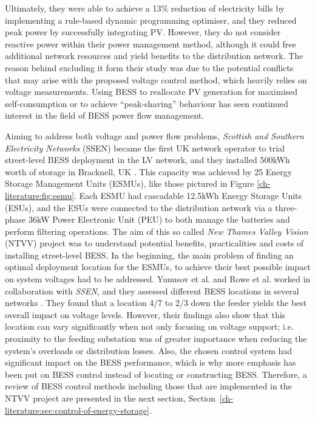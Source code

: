 Ultimately, they were able to achieve a 13\% reduction of electricity bills by implementing a rule-based dynamic programming optimiser, and they reduced peak power by successfully integrating PV.
However, they do not consider reactive power within their power management method, although it could free additional network resources and yield benefits to the distribution network.
The reason behind excluding it form their study was due to the potential conflicts that may arise with the proposed voltage control method, which heavily relies on voltage measurements.
Using BESS to reallocate PV generation for maximised self-consumption \cite{SaniHassan2017} or to achieve ``peak-shaving'' behaviour \cite{Bennett2015, DePaola2016} has seen continued interest in the field of BESS power flow management.



Aiming to address both voltage and power flow problems, \textit{Scottish and Southern Electricity Networks} (SSEN) became the first UK network operator to trial street-level BESS deployment in the LV network, and they installed 500kWh worth of storage in Bracknell, UK \cite{SSEN2016}.
This capacity was achieved by 25 Energy Storage Management Units (ESMUs), like those pictured in Figure \ref{ch-literature:fig:esmu}.
Each ESMU had cascadable 12.5kWh Energy Storage Units (ESUs), and the ESUs were connected to the distribution network via a three-phase 36kW Power Electronic Unit (PEU) to both manage the batteries and perform filtering operations.
The aim of this so called \textit{New Thames Valley Vision} (NTVV) project was to understand potential benefits, practicalities and costs of installing street-level BESS.
In the beginning, the main problem of finding an optimal deployment location for the ESMUs, to achieve their best possible impact on system voltages had to be addressed.
Yunusov et al. and Rowe et al. worked in collaboration with \textit{SSEN}, and they assessed different BESS locations in several networks \cite{Yunusov2016, Rowe2014, Rowe2014a}.
They found that a location 4/7 to 2/3 down the feeder yields the best overall impact on voltage levels.
However, their findings also show that this location can vary significantly when not only focusing on voltage support; i.e. proximity to the feeding substation was of greater importance when reducing the system's overloads or distribution losses.
Also, the chosen control system had significant impact on the BESS performance, which is why more emphasis has been put on BESS control instead of locating or constructing BESS.
Therefore, a review of BESS control methods including those that are implemented in the NTVV project are presented in the next section, Section~\ref{ch-literature:sec:control-of-energy-storage}.








